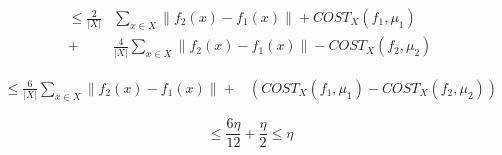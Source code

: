 \documentclass[letterpaper,12pt,titlepage,oneside,final]{book}
\begin{document}
\begin{equation}
\begin{aligned} 
\leq \frac{2}{|X|}&\sum_{x\in X} \| f_2(x) - f_1(x) \| 
+ COST_X(f_1, \mu_1)\\ 
+& \frac{4}{|X|}\sum_{x\in X} \|f_2(x) - f_1(x)\|
 - COST_X(f_2, \mu_2)
\end{aligned}
\end{equation}


\begin{align}
\leq \frac{6}{|X|}\sum_{x\in X} \| f_2(x)-f_1(x) \| 
+ & \left( COST_X(f_1, \mu_1) - COST_X(f_2, \mu_2) \right)
\end{align}

\begin{equation}
\leq \frac{6\eta}{12} + \frac{\eta}{2} \leq \eta
\end{equation}





%
%
\end{document}
